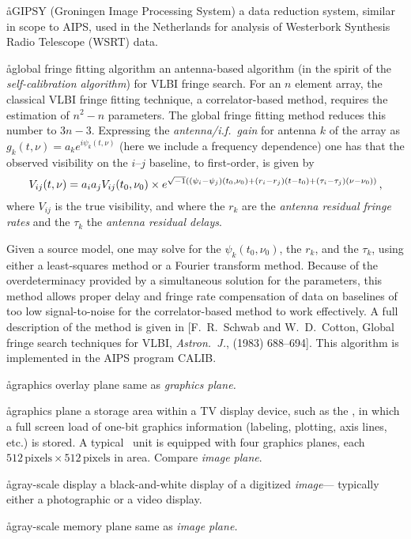 \aa{GIPSY}
(Groningen Image Processing System)
a data reduction system, similar in scope to AIPS, used in the Netherlands for
analysis of Westerbork Synthesis Radio Telescope (WSRT) data.

\aa{global fringe fitting algorithm}
an antenna-based algorithm
(in the spirit of the {\it self-calibration algorithm}\/)
for VLBI fringe search.
For an $n$ element array, the classical VLBI fringe fitting technique,
a correlator-based method, requires the estimation of $n^2-n$ parameters.
The global fringe fitting method reduces this number to $3n-3$.
Expressing the {\it antenna/i.f.\ gain} for antenna $k$ of the
array as $g_k(t,\nu)=a_ke^{i\psi_k(t,\nu)}$
(here we include a frequency dependence)
one has that the observed visibility on the $i$--$j$ baseline,
to first-order, is given by
$$
V_{ij}(t,\nu)=a_ia_jV_{ij}(t_0,\nu_0) \\
\hfil\times
e^{\sqrt{-1}((\psi_i-\psi_j)(t_0,\nu_0)+(r_i-r_j)(t-t_0)+(\tau_i-\tau_j)
(\nu-\nu_0))} \,,$$
where $V_{ij}$ is the true visibility,
and where the $r_k$ are the {\it antenna residual fringe rates}
and the $\tau_k$ the {\it antenna residual delays}.
\par
Given a source model, one may solve for the $\psi_k(t_0,\nu_0)$,
the $r_k$, and the $\tau_k$,
using either a least-squares method or a Fourier transform method.
Because of the overdeterminacy provided by a simultaneous
solution for the parameters,
this method allows proper delay and fringe rate compensation
of data on baselines of too low signal-to-noise
for the correlator-based method to work effectively.
A full description of the method is given in
[F.~R.~Schwab and W.~D.~Cotton, Global fringe search techniques
for VLBI, {\it Astron.~J.},  (1983) 688--694].
This algorithm is implemented in the AIPS program CALIB.

\aa{graphics overlay plane} same as {\it graphics plane.}

\aa{graphics plane}
a storage area within a TV display device, such as the \iis,
in which a full screen load of one-bit graphics information (labeling,
plotting, axis lines, etc.) is stored.
A typical \iis\ unit is equipped with four graphics planes,
each $512\,\text{pixels}\times512\,\text{pixels}$ in area.
Compare {\it image plane}.

\aa{gray-scale display}
a black-and-white display of a digitized {\it image}---%
typically either a photographic or a video display.

\aa{gray-scale memory plane} same as {\it image plane.}

